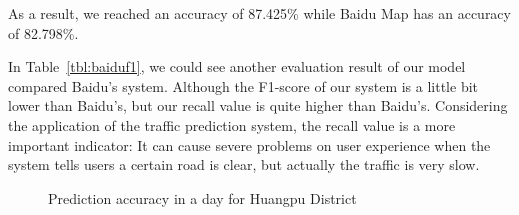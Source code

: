 As a result, we reached an accuracy of 87.425\% while Baidu Map has an accuracy of 82.798\%. 


In Table~\ref{tbl:baiduf1}, we could see another evaluation result of our model compared Baidu's system. Although the F1-score of our system is a little bit lower than Baidu's, but our recall value is quite higher than Baidu's. 
Considering the application of the traffic prediction system, the recall value is a more important indicator: It can cause severe problems on user experience when the system tells users a certain road is clear, but actually the traffic is very slow.




\begin{figure}[th]
\centering
{}
\caption{Prediction accuracy in a day for Huangpu District}
\label{fig:daytimeacc}
\end{figure}


